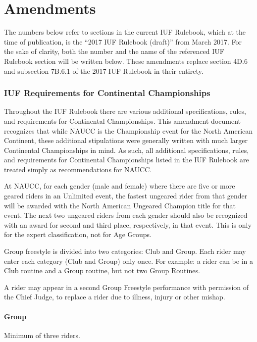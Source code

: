 \part{Amendments}
\parttoc
{}

The numbers below refer to sections in the current IUF Rulebook, which at the time of publication, is the ``2017 IUF Rulebook (draft)'' from March 2017. For the sake of clarity, both the number and the name of the referenced IUF Rulebook section will be written below. These amendments replace section 4D.6 and subsection 7B.6.1 of the 2017 IUF Rulebook in their entirety.

\section{IUF Requirements for Continental Championships}
Throughout the IUF Rulebook there are various additional specifications, rules, and requirements for Continental Championships.
This amendment document recognizes that while NAUCC is the Championship event for the North American Continent, these additional stipulations were generally written with much larger Continental Championships in mind.
As such, all additional specifications, rules, and requirements for Continental Championships listed in the IUF Rulebook are treated simply as recommendations for NAUCC.

At NAUCC, for each gender (male and female) where there are five or more geared riders in an Unlimited event, the fastest ungeared rider from that gender will be awarded with the North American Ungeared Champion title for that event.
The next two ungeared riders from each gender should also be recognized with an award for second and third place, respectively, in that event.
This is only for the expert classification, not for Age Groups.

Group freestyle is divided into two categories: Club and Group.
Each rider may enter each category (Club and Group) only once.
For example: a rider can be in a Club routine and a Group routine, but not two Group Routines.

A rider may appear in a second Group Freestyle performance with permission of the Chief Judge, to replace a rider due to illness, injury or other mishap.

\subsection{Group}
Minimum of three riders.

